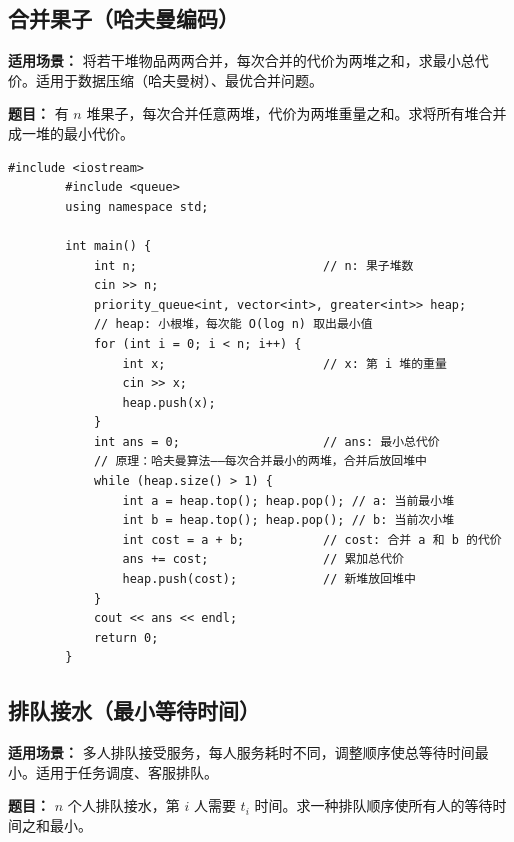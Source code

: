 \documentclass[12pt,a4paper]{ctexart}
\begin{document}
	\subsection{合并果子（哈夫曼编码）}
	\textbf{适用场景：} 将若干堆物品两两合并，每次合并的代价为两堆之和，求最小总代价。适用于数据压缩（哈夫曼树）、最优合并问题。
	
	\textbf{题目：} 有 $n$ 堆果子，每次合并任意两堆，代价为两堆重量之和。求将所有堆合并成一堆的最小代价。
	
	\begin{lstlisting}[caption={贪心——小根堆每次取最小的两堆合并}]
		#include <iostream>
		#include <queue>
		using namespace std;
		
		int main() {
			int n;                          // n: 果子堆数
			cin >> n;
			priority_queue<int, vector<int>, greater<int>> heap;
			// heap: 小根堆，每次能 O(log n) 取出最小值
			for (int i = 0; i < n; i++) {
				int x;                      // x: 第 i 堆的重量
				cin >> x;
				heap.push(x);
			}
			int ans = 0;                    // ans: 最小总代价
			// 原理：哈夫曼算法——每次合并最小的两堆，合并后放回堆中
			while (heap.size() > 1) {
				int a = heap.top(); heap.pop(); // a: 当前最小堆
				int b = heap.top(); heap.pop(); // b: 当前次小堆
				int cost = a + b;           // cost: 合并 a 和 b 的代价
				ans += cost;                // 累加总代价
				heap.push(cost);            // 新堆放回堆中
			}
			cout << ans << endl;
			return 0;
		}
	\end{lstlisting}
	
	\subsection{排队接水（最小等待时间）}
	\textbf{适用场景：} 多人排队接受服务，每人服务耗时不同，调整顺序使总等待时间最小。适用于任务调度、客服排队。
	
	\textbf{题目：} $n$ 个人排队接水，第 $i$ 人需要 $t_i$ 时间。求一种排队顺序使所有人的等待时间之和最小。
	
\end{document}
